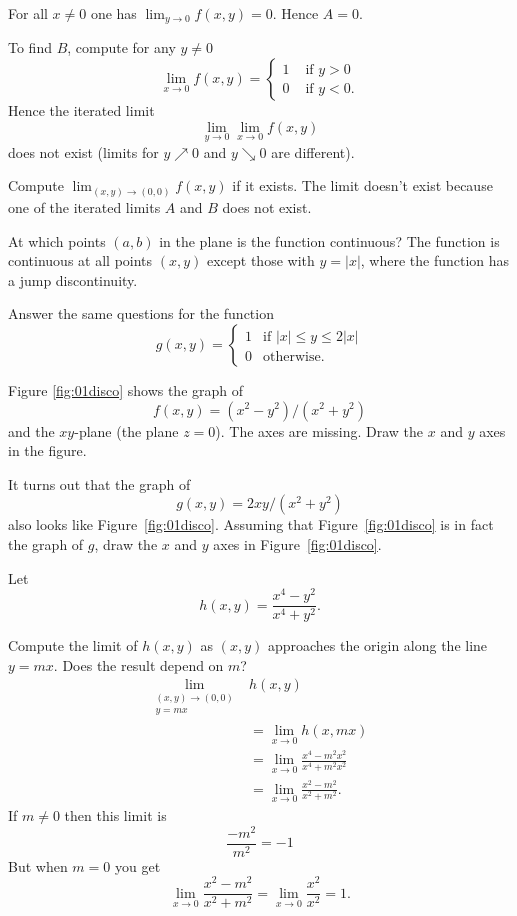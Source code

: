 \begin{multicols}{2}
For all $x\neq0$ one has $\lim_{y\to 0}f(x, y) = 0$.
Hence $A = 0$.

To find $B$, compute for any $y\neq 0$
\[
\lim_{x\to0} f(x, y) =
\begin{cases}
  1 & \text{ if }y>0\\
  0 & \text{ if }y<0.
\end{cases}
\]
Hence the iterated limit
\[
\lim_{y\to0}\lim_{x\to0} f(x, y)
\]
does not exist (limits for $y\nearrow 0$ and $y\searrow 0$ are different).

\endanswer


\subprob Compute $\lim_{(x,y)\to(0,0)}f(x,y)$ if it exists.
\answer
The limit doesn't exist because one of the iterated limits $A$
and $B$ does not exist.
\endanswer



\subprob At which points $(a,b)$ in the plane is the function
continuous?
\answer
The function is continuous at all points $(x,y)$ except those with
$y=|x|$, where the function has a jump discontinuity.
\endanswer


\subprob Answer the same questions for the function
\[
g(x, y) = 
\begin{cases}
  1 & \text{if $|x|\leq y\leq 2|x|$} \\
  0 & \text{otherwise}.
\end{cases}
\]

\problem \label{prb:01disco-axes}
\subprob Figure \ref{fig:01disco} shows the
graph of
\[
f(x, y) = (x^2-y^2) / (x^2 + y^2)
\]
and the $xy$-plane (the plane $z=0	$).  The axes are missing.
Draw the $x$ and $y$ axes in the figure.

\subprob It turns out that the graph of
\[
g(x, y) = 2xy/(x^2+y^2)
\]
also looks like Figure~\ref{fig:01disco}.  Assuming that
Figure~\ref{fig:01disco} is in fact the graph of $g$, draw the
$x$ and $y$ axes in Figure~\ref{fig:01disco}.

\problem  Let
\[
h(x,y) = \frac{x^4-y^2}{x^4+y^2}.
\]

\subprob Compute the limit of $h(x, y)$ as $(x,y)$ approaches the
origin along the line $y=mx$.  Does the result depend on $m$?
\answer
\begin{align*}
  \lim_{\substack{(x, y)\to(0,0)\\y=mx}}& h(x,y)\\
  &=\lim_{x\to 0} h(x, mx)\\
  &=\lim_{x\to0} \frac{x^4 - m^2x^2} {x^4+m^2x^2}\\
  &=\lim_{x\to0} \frac{x^2 - m^2} {x^2+m^2}.
\end{align*}
If $m\neq0$ then this limit is
\[
\frac{-m^2} {m^2} = -1
\]
But when $m=0$ you get
\[
\lim_{x\to0} \frac{x^2 - m^2} {x^2+m^2}
=\lim_{x\to0} \frac{x^2} {x^2}
=1.
\]
\endanswer



\end{multicols}
